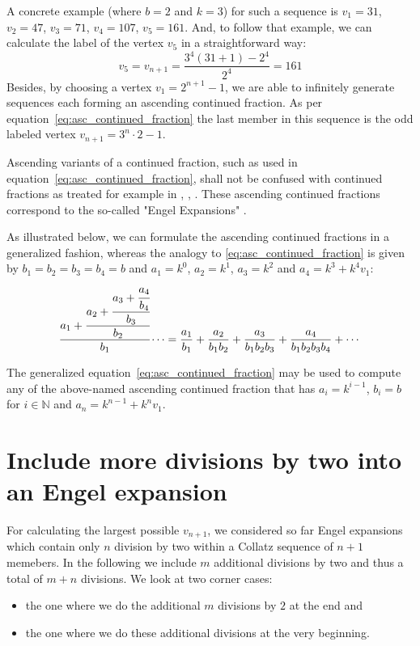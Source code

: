 \begin{example}
	A concrete example (where $b=2$ and $k=3$) for such a sequence is $v_1=31$, $v_2=47$, $v_3=71$, $v_4=107$, $v_5=161$. And, to follow that example, we can calculate the label of the vertex $v_5$ in a straightforward way:
	\[
	v_5=v_{n+1}=\frac{3^4(31+1)-2^4}{2^4}=161
	\]
	Besides, by choosing a vertex $v_1=2^{n+1}-1$, we are able to infinitely generate sequences each forming an ascending continued fraction. As per equation~\ref{eq:asc_continued_fraction} the last member in this sequence is the odd labeled vertex $v_{n+1}=3^n\cdot2-1$.
\end{example}

\begin{remark}
	Ascending variants of a continued fraction, such as used in equation~\ref{eq:asc_continued_fraction}, shall not be confused with continued fractions as treated for example in \cite{Ref_Moore}, \cite{Ref_Hensley}, \cite{Ref_Borwe_etal}. These ascending continued fractions correspond to the so-called "Engel Expansions" \cite{Ref_Kraaikamp_Wu}.
\end{remark}

\par\noindent
As illustrated below, we can formulate the ascending continued fractions in a generalized fashion, whereas the analogy to \ref{eq:asc_continued_fraction} is given by $b_1=b_2=b_3=b_4=b$ and $a_1=k^0$, $a_2=k^1$, $a_3=k^2$ and $a_4=k^3+k^4v_1$:
\[
\cfrac{a_1+\cfrac{a_2+\cfrac{a_3+\cfrac{a_4}{b_4}}{b_3}}{b_2}}{b_1}\dotsb=\frac{a_1}{b_1}+\frac{a_2}{b_1b_2}+\frac{a_3}{b_1b_2b_3}+\frac{a_4}{b_1b_2b_3b_4}+\cdots
\]

\par\medskip
The generalized equation~\ref{eq:asc_continued_fraction} may be used to compute any of the above-named ascending continued fraction that has $a_i=k^{i-1}$, $b_i=b$ for $i\in\mathbb{N}$ and $a_n=k^{n-1}+k^nv_1$.

\section{Include more divisions by two into an Engel expansion}
\label{sec:include_divisions_engel_expansion}
For calculating the largest possible $v_{n+1}$, we considered so far Engel expansions which contain only $n$ division by two within a Collatz sequence of $n+1$ memebers. In the following we include $m$ additional divisions by two and thus a total of $m+n$ divisions. We look at two corner cases:
\begin{itemize}
	\item the one where we do the additional $m$ divisions by $2$ at the end and
	\item the one where we do these additional divisions at the very beginning.
\end{itemize}

